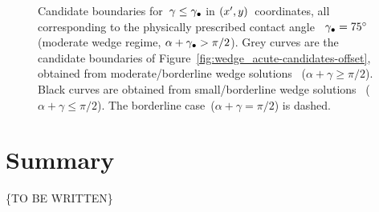 \begin{figure}
  \newcommand*{\subfigurewidth}{0.31\textwidth}
  \begin{subfigure}[t]{\subfigurewidth}
  \end{subfigure}
  \hfill
  \begin{subfigure}[t]{\subfigurewidth}
  \end{subfigure}
  \hfill
  \begin{subfigure}[t]{\subfigurewidth}
  \end{subfigure}
  \caption{
    Candidate boundaries for~$\gamma \le \gamma_\bullet$
    in $(x', y)$~coordinates,
    all corresponding to the physically prescribed contact angle~%
    $\gamma_\bullet = \SI{75}{\degree}$
    (moderate wedge regime, $\alpha + \gamma_\bullet > \pi/2$).
    Grey curves are the candidate boundaries of
    Figure~\ref{fig:wedge_acute-candidates-offset},
    obtained from moderate/borderline wedge solutions~%
      ($\alpha + \gamma \ge \pi/2$).
    Black curves are obtained from small/borderline wedge solutions~%
      ($\alpha + \gamma \le \pi/2$).
    The borderline case~($\alpha + \gamma = \pi/2$) is dashed.
  }
  \label{fig:wedge_small-moderate-candidates-offset}
\end{figure}

\section{Summary}
\label{sec:small.summary}

\{TO BE WRITTEN\}
